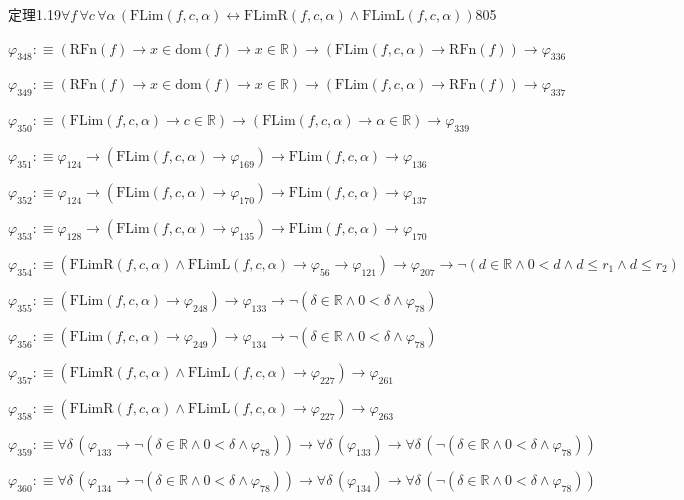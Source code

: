 \begin{fullproof}{定理1.19}{$\forall f\,\forall c\,\forall \alpha\,(\mathrm{FLim}(f,c,\alpha) \leftrightarrow \mathrm{FLimR}(f,c,\alpha) \land \mathrm{FLimL}(f,c,\alpha))$}{805}
\begin{abbrevlist}
\item $\varphi_{348} :\equiv (\mathrm{RFn}(f) \to x \in \mathrm{dom}(f) \to x \in \mathbb{R}) \to (\mathrm{FLim}(f,c,\alpha) \to \mathrm{RFn}(f)) \to \varphi_{336}$
\item $\varphi_{349} :\equiv (\mathrm{RFn}(f) \to x \in \mathrm{dom}(f) \to x \in \mathbb{R}) \to (\mathrm{FLim}(f,c,\alpha) \to \mathrm{RFn}(f)) \to \varphi_{337}$
\item $\varphi_{350} :\equiv (\mathrm{FLim}(f,c,\alpha) \to c \in \mathbb{R}) \to (\mathrm{FLim}(f,c,\alpha) \to \alpha \in \mathbb{R}) \to \varphi_{339}$
\item $\varphi_{351} :\equiv \varphi_{124} \to (\mathrm{FLim}(f,c,\alpha) \to \varphi_{169}) \to \mathrm{FLim}(f,c,\alpha) \to \varphi_{136}$
\item $\varphi_{352} :\equiv \varphi_{124} \to (\mathrm{FLim}(f,c,\alpha) \to \varphi_{170}) \to \mathrm{FLim}(f,c,\alpha) \to \varphi_{137}$
\item $\varphi_{353} :\equiv \varphi_{128} \to (\mathrm{FLim}(f,c,\alpha) \to \varphi_{135}) \to \mathrm{FLim}(f,c,\alpha) \to \varphi_{170}$
\item $\varphi_{354} :\equiv (\mathrm{FLimR}(f,c,\alpha) \land \mathrm{FLimL}(f,c,\alpha) \to \varphi_{56} \to \varphi_{121}) \to \varphi_{207} \to \neg (d \in \mathbb{R} \land 0 < d \land d \leq r_{1} \land d \leq r_{2})$
\item $\varphi_{355} :\equiv (\mathrm{FLim}(f,c,\alpha) \to \varphi_{248}) \to \varphi_{133} \to \neg (\delta \in \mathbb{R} \land 0 < \delta \land \varphi_{78})$
\item $\varphi_{356} :\equiv (\mathrm{FLim}(f,c,\alpha) \to \varphi_{249}) \to \varphi_{134} \to \neg (\delta \in \mathbb{R} \land 0 < \delta \land \varphi_{78})$
\item $\varphi_{357} :\equiv (\mathrm{FLimR}(f,c,\alpha) \land \mathrm{FLimL}(f,c,\alpha) \to \varphi_{227}) \to \varphi_{261}$
\item $\varphi_{358} :\equiv (\mathrm{FLimR}(f,c,\alpha) \land \mathrm{FLimL}(f,c,\alpha) \to \varphi_{227}) \to \varphi_{263}$
\item $\varphi_{359} :\equiv \forall \delta\,(\varphi_{133} \to \neg (\delta \in \mathbb{R} \land 0 < \delta \land \varphi_{78})) \to \forall \delta\,(\varphi_{133}) \to \forall \delta\,(\neg (\delta \in \mathbb{R} \land 0 < \delta \land \varphi_{78}))$
\item $\varphi_{360} :\equiv \forall \delta\,(\varphi_{134} \to \neg (\delta \in \mathbb{R} \land 0 < \delta \land \varphi_{78})) \to \forall \delta\,(\varphi_{134}) \to \forall \delta\,(\neg (\delta \in \mathbb{R} \land 0 < \delta \land \varphi_{78}))$

\end{abbrevlist}
\end{fullproof}
